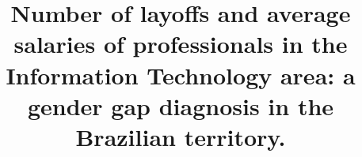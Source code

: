 \title{Number of layoffs and average salaries of professionals in the Information Technology area: a gender gap diagnosis in the Brazilian territory.
\\
}